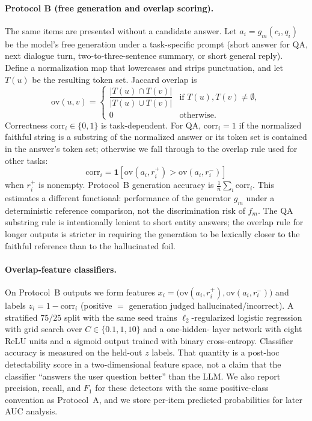 \documentclass[11pt]{article}
\begin{document}
\paragraph{Protocol B (free generation and overlap scoring).}
The same items are presented without a candidate answer. Let $a_i=g_m(c_i,q_i)$
be the model's free generation under a task-specific prompt (short answer for
QA, next dialogue turn, two-to-three-sentence summary, or short general reply).
Define a normalization map that lowercases and strips punctuation, and let
$T(u)$ be the resulting token set. Jaccard overlap is
\[
\mathrm{ov}(u,v)=\begin{cases}
\dfrac{|T(u)\cap T(v)|}{|T(u)\cup T(v)|} & \text{if }T(u),T(v)\neq\emptyset,\\
0 & \text{otherwise.}
\end{cases}
\]
Correctness $\mathrm{corr}_i\in\{0,1\}$ is task-dependent. For QA,
$\mathrm{corr}_i=1$ if the normalized faithful string is a substring of the
normalized answer or its token set is contained in the answer's token set;
otherwise we fall through to the overlap rule used for other tasks:
\[
\mathrm{corr}_i=\mathbf{1}\!\left[\mathrm{ov}(a_i,r_i^+)>\mathrm{ov}(a_i,r_i^-)\right]
\]
when $r_i^+$ is nonempty. Protocol~B generation accuracy is
$\frac{1}{n}\sum_i\mathrm{corr}_i$. This estimates a different functional:
performance of the generator $g_m$ under a deterministic reference comparison,
not the discrimination risk of $f_m$. The QA substring rule is intentionally
lenient to short entity answers; the overlap rule for longer outputs is stricter
in requiring the generation to be lexically closer to the faithful reference
than to the hallucinated foil.

\paragraph{Overlap-feature classifiers.}
On Protocol~B outputs we form features
$x_i=\bigl(\mathrm{ov}(a_i,r_i^+),\mathrm{ov}(a_i,r_i^-)\bigr)$ and labels
$z_i=1-\mathrm{corr}_i$ (positive $=$ generation judged hallucinated/incorrect).
A stratified $75/25$ split with the same seed trains $\ell_2$-regularized
logistic regression with grid search over $C\in\{0.1,1,10\}$ and a one-hidden-
layer network with eight ReLU units and a sigmoid output trained with binary
cross-entropy. Classifier accuracy is measured on the held-out $z$ labels. That
quantity is a post-hoc detectability score in a two-dimensional feature space,
not a claim that the classifier ``answers the user question better'' than the
LLM. We also report precision, recall, and $F_1$ for these detectors with the
same positive-class convention as Protocol~A, and we store per-item predicted
probabilities for later AUC analysis.
\end{document}
